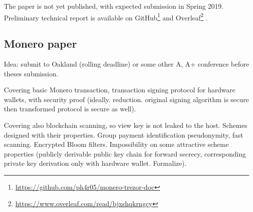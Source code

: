 \documentclass[
  digital, %
  twoside, %
  table,   %
  lof,     %
  lot,     %
]{fithesis3}
\newcounter{ph4_show_guides}
\theoremstyle{definition}
\theoremstyle{remark}
\begin{document}
The paper is not yet published, with expected submission in Spring 2019. 
Preliminary technical report is available on GitHub\footnote{\url{https://github.com/ph4r05/monero-trezor-doc}} and Overleaf\footnote{\url{https://www.overleaf.com/read/bjxshqkrngcy}} \cite{trezor_monero_tech}.

\begin{ecmmnt}\subsection{Monero paper}

Idea: submit to Oakland (rolling deadline) or some other A, A+ conference before theses submission. 

Covering basic Monero transaction, transaction signing protocol for hardware wallets, with security proof (ideally. reduction. original signing algorithm is secure then transformed protocol is secure as well).

Covering also blockchain scanning, so view key is not leaked to the host. Schemes designed with their properties. Group payment identification pseudonymity, fast scanning. Encrypted Bloom filters. Impossibility on some attractive scheme properties (publicly derivable public key chain for forward secrecy, corresponding private key derivation only with hardware wallet. Formalize). 
\end{ecmmnt}
\end{document}
